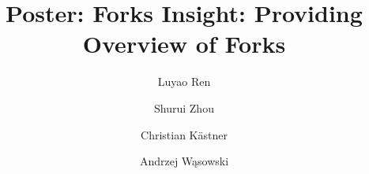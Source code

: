 \documentclass[sigconf]{acmart}
\newcommand{\Luyao}[1]{\textcolor{orange}{(Luyao: #1)}}
\begin{document}
\title{Poster: Forks Insight: Providing Overview of Forks}

	\author{Luyao Ren}

	\author{Shurui Zhou}
	
	\author{Christian K\"{a}stner} 

	
    \author{Andrzej W\k{a}sowski}


	\renewcommand{\shortauthors}{L. Ren et al.}
	

%


\maketitle



 
\end{document}
